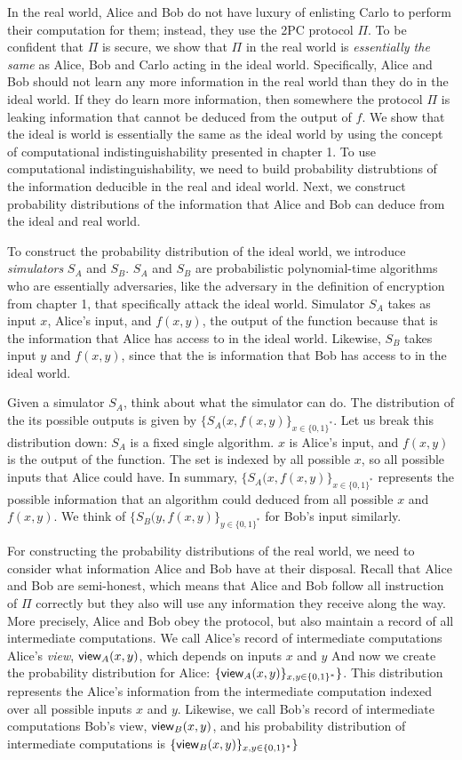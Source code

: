 In the real world, Alice and Bob do not have luxury of enlisting Carlo to perform their computation for them; instead, they use the 2PC protocol $\Pi$. 
To be confident that $\Pi$ is secure, we show that $\Pi$ in the real world is \textit{essentially the same} as Alice, Bob and Carlo acting in the ideal world.
Specifically, Alice and Bob should not learn any more information in the real world than they do in the ideal world.
If they do learn more information, then somewhere the protocol $\Pi$ is leaking information that cannot be deduced from the output of $f$. 
We show that the ideal is world is essentially the same as the ideal world by using the concept of computational indistinguishability presented in chapter 1.
To use computational indistinguishability, we need to build probability distrubtions of the information deducible in the real and ideal world.
Next, we construct probability distributions of the information that Alice and Bob can deduce from the ideal and real world.

To construct the probability distribution of the ideal world, we introduce \textit{simulators} $S_A$ and $S_B$.
$S_A$ and $S_B$ are probabilistic polynomial-time algorithms who are essentially adversaries, like the adversary in the definition of encryption from chapter 1, that specifically attack the ideal world.
Simulator $S_A$ takes as input $x$, Alice's input, and $f(x,y)$, the output of the function because that is the information that Alice has access to in the ideal world.
Likewise, $S_B$ takes input $y$ and $f(x,y)$, since that the is information that Bob has access to in the ideal world.

Given a simulator $S_A$, think about what the simulator can do.
The distribution of the its possible outputs is given by $\{S_A(x, f(x,y)\}_{x \in \{0,1\}^*}$.
Let us break this distribution down: $S_A$ is a fixed single algorithm.
$x$ is Alice's input, and $f(x,y)$ is the output of the function.
The set is indexed by all possible $x$, so all possible inputs that Alice could have.
In summary, $\{S_A(x, f(x,y)\}_{x \in \{0,1\}^*}$ represents the possible information that an algorithm could deduced from all possible $x$ and $f(x,y)$.
We think of $\{S_B(y, f(x,y)\}_{y \in \{0,1\}^*}$ for Bob's input similarly.

For constructing the probability distributions of the real world, we need to consider what information Alice and Bob have at their disposal.
Recall that Alice and Bob are semi-honest, which means that Alice and Bob follow all instruction of $\Pi$ correctly but they also will use any information they receive along the way.
More precisely, Alice and Bob obey the protocol, but also maintain a record of all intermediate computations.
We call Alice's record of intermediate computations Alice's \textit{view}, ${\sf view}_A(x, y)$, which depends on inputs $x$ and $y$
And now we create the probability distribution for Alice: $\{{\sf view}_A(x, y)\}_{x, y \in \{0,1\}^*}\}$.
This distribution represents the Alice's information from the intermediate computation indexed over all possible inputs $x$ and $y$.
Likewise, we call Bob's record of intermediate computations Bob's view,  ${\sf view}_B(x, y)$, and his probability distribution of intermediate computations is $\{{\sf view}_B(x, y)\}_{x,y \in \{0,1\}^*}\}$


